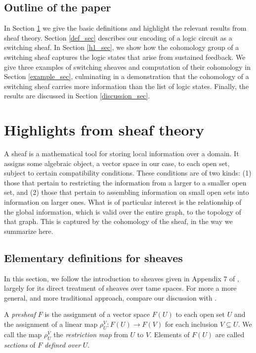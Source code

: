 \documentclass{amsart}
\theoremstyle{plain}
\theoremstyle{definition}
\begin{document}
\subsection{Outline of the paper}

In Section \ref{sheaf_sec} we give the basic definitions and highlight
the relevant results from sheaf theory.  Section
\ref{def_sec} describes our encoding of a logic circuit as a
switching sheaf.  In Section \ref{h1_sec}, we show how the cohomology
group of a switching sheaf captures the logic states that arise from
sustained feedback.  We give three examples of switching sheaves and
computation of their cohomology in Section \ref{example_sec},
culminating in a demonstration that the cohomology of a
switching sheaf carries more information than the list of logic
states.  Finally, the results are discussed in Section
\ref{discussion_sec}.

\section{Highlights from sheaf theory}
\label{sheaf_sec}

A sheaf is a mathematical tool for storing local information over a
domain.  It assigns some algebraic object, a vector space in our case,
to each open set, subject to certain compatibility conditions.  These
conditions are of two kinds: (1) those that pertain to restricting the
information from a larger to a smaller open set, and (2) those that
pertain to assembling information on small open sets into information
on larger ones.  What is of particular interest is the relationship of
the global information, which is valid over the entire graph, to the
topology of that graph.  This is captured by the cohomology of the
sheaf, in the way we summarize here.

\subsection{Elementary definitions for sheaves}
In this section, we follow the introduction to sheaves given in
Appendix 7 of \cite{Hubbard}, largely for its direct treatment of
sheaves over tame spaces.  For more a more general, and more
traditional approach, compare our discussion with \cite{Bredon}.

A {\it presheaf} $F$ is the assignment of a vector space $F(U)$ to each
open set $U$ and the assignment of a linear map $\rho_U^V: F(U) \to F(V)$ for
each inclusion $V \subseteq U$.  We call the map $\rho_U^V$ the {\it
  restriction map} from $U$ to $V$.  Elements of $F(U)$ are called
{\it sections} of $F$ {\it defined over} $U$.  
\end{document}
